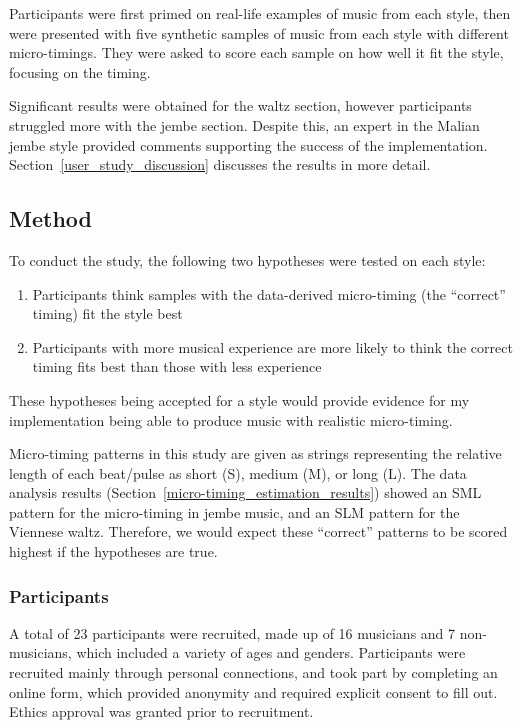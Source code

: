 \documentclass[12pt,twoside,openright]{report}
\begin{document}
Participants were first primed on real-life
examples of music from each style, then were presented with five synthetic
samples of music from each style with different micro-timings. They were asked
to score each sample on how well it fit the style, focusing on the timing.

Significant results were obtained for the waltz section, however participants
struggled more with the jembe section. Despite this, an expert in the Malian
jembe style provided comments supporting the success of the implementation. Section~\ref{user_study_discussion} discusses the results in more detail.


\subsection{Method} \label{user_study_method}

To conduct the study, the following two hypotheses were tested on each style:

\begin{enumerate}
    \item \label{hypothesis_1} Participants think samples with the data-derived micro-timing (the ``correct'' timing) fit the style best
    \item \label{hypothesis_2} Participants with more musical experience are more likely to think the correct timing fits best than those with less experience
\end{enumerate}

These hypotheses being accepted for a style would provide evidence for my
implementation being able to produce music with realistic micro-timing.

Micro-timing patterns in this study are given as strings representing the
relative length of each beat/pulse as short (S), medium (M), or long (L). The
data analysis results (Section~\ref{micro-timing_estimation_results}) showed an SML pattern for the micro-timing in
jembe music, and an SLM pattern for the Viennese waltz. Therefore, we would
expect these ``correct'' patterns to be scored highest if the hypotheses are
true.

\subsubsection{Participants} \label{participants}

A total of 23 participants were recruited, made up of 16 musicians and 7
non-musicians, which included a variety of ages and genders. Participants were
recruited mainly through personal connections, and took part by completing an
online form, which provided anonymity and required explicit consent to fill out.
Ethics approval was granted prior to recruitment.
\end{document}
